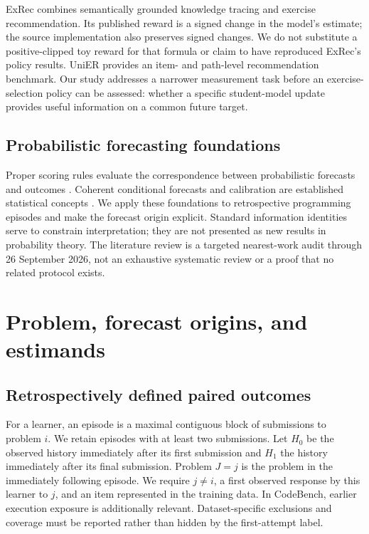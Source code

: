 \documentclass[11pt]{article}
\newcommand{\1}{\mathbb{I}}
\begin{document}
ExRec \cite{ozyurt2025exrec} combines semantically grounded knowledge tracing and exercise recommendation. Its published reward is a signed change in the model's estimate; the source implementation also preserves signed changes. We do not substitute a positive-clipped toy reward for that formula or claim to have reproduced ExRec's policy results. UniER \cite{cheng2026unier} provides an item- and path-level recommendation benchmark. Our study addresses a narrower measurement task before an exercise-selection policy can be assessed: whether a specific student-model update provides useful information on a common future target.

\subsection{Probabilistic forecasting foundations}
Proper scoring rules evaluate the correspondence between probabilistic forecasts and outcomes \cite{gneiting2007}. Coherent conditional forecasts and calibration are established statistical concepts \cite{dawid1982}. We apply these foundations to retrospective programming episodes and make the forecast origin explicit. Standard information identities serve to constrain interpretation; they are not presented as new results in probability theory. The literature review is a targeted nearest-work audit through 26 September 2026, not an exhaustive systematic review or a proof that no related protocol exists.

\section{Problem, forecast origins, and estimands}
\subsection{Retrospectively defined paired outcomes}
For a learner, an episode is a maximal contiguous block of submissions to problem $i$. We retain episodes with at least two submissions. Let $H_0$ be the observed history immediately after its first submission and $H_1$ the history immediately after its final submission. Problem $J=j$ is the problem in the immediately following episode. We require $j\ne i$, a first observed response by this learner to $j$, and an item represented in the training data. In CodeBench, earlier execution exposure is additionally relevant. Dataset-specific exclusions and coverage must be reported rather than hidden by the first-attempt label.
\end{document}
